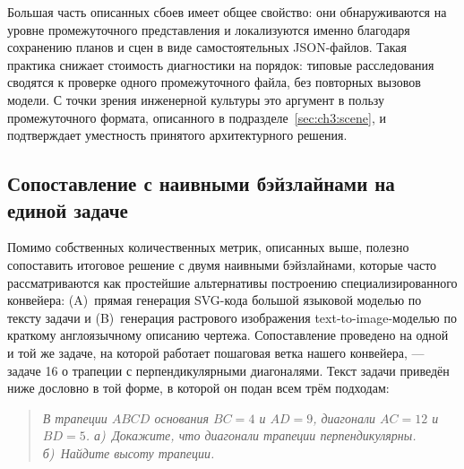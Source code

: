 Большая часть описанных сбоев имеет общее свойство: они обнаруживаются на уровне промежуточного представления и локализуются именно благодаря сохранению планов и сцен в виде самостоятельных JSON\nobreakdash-файлов. Такая практика снижает стоимость диагностики на порядок: типовые расследования сводятся к проверке одного промежуточного файла, без повторных вызовов модели. С точки зрения инженерной культуры это аргумент в пользу промежуточного формата, описанного в подразделе~\ref{sec:ch3:scene}, и подтверждает уместность принятого архитектурного решения.

\subsection{Сопоставление с наивными бэйзлайнами на единой задаче}
\label{sec:ch3:baselines}

Помимо собственных количественных метрик, описанных выше, полезно сопоставить итоговое решение с двумя наивными бэйзлайнами, которые часто рассматриваются как простейшие альтернативы построению специализированного конвейера: (A)~прямая генерация SVG\nobreakdash-кода большой языковой моделью по тексту задачи и (B)~генерация растрового изображения text\nobreakdash-to\nobreakdash-image\nobreakdash-моделью по краткому англоязычному описанию чертежа. Сопоставление проведено на одной и той же задаче, на которой работает пошаговая ветка нашего конвейера, --- задаче 16 о трапеции с перпендикулярными диагоналями. Текст задачи приведён ниже дословно в той форме, в которой он подан всем трём подходам:

\begin{quote}
\textit{В трапеции \(ABCD\) основания \(BC = 4\) и \(AD = 9\), диагонали \(AC = 12\) и \(BD = 5\). а)~Докажите, что диагонали трапеции перпендикулярны. б)~Найдите высоту трапеции.}
\end{quote}

